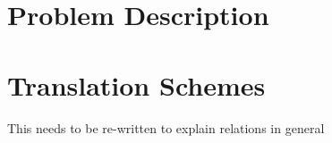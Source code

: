 

\section{Problem Description}


\section{Translation Schemes}








This needs to be re-written to explain relations in general




















